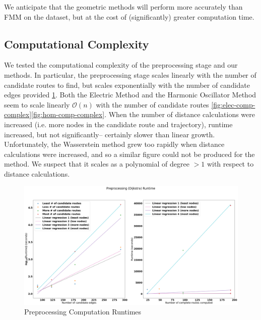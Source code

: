 \documentclass{article}
\numberwithin{equation}{section}
\theoremstyle{definition}
\begin{document}

We anticipate that the geometric methods will perform more accurately than FMM on the dataset, but at the cost of (significantly) greater computation time.

\subsection{Computational Complexity}

We tested the computational complexity of the preprocessing stage and our methods. In particular, the preprocessing stage scales linearly with the number of candidate routes to find, but scales exponentially with the number of candidate edges provided \ref{fig:pre-comp-complex}. Both the Electric Method and the Harmonic Oscillator Method seem to scale linearly $\mathcal{O}(n)$ with the number of candidate routes \ref{fig:elec-comp-complex}\ref{fig:hom-comp-complex}. When the number of distance calculations were increased (i.e. more nodes in the candidate route and trajectory), runtime increased, but not significantly-- certainly slower than linear growth. Unfortunately, the Wasserstein method grew too rapidly when distance calculations were increased, and so a similar figure could not be produced for the method. We suspect that it scales as a polynomial of degree $>1$ with respect to distance calculations.

\begin{figure}
    \centering
    \includegraphics[scale = 0.25]{Jupyter Notebook LaTeX/preprocessing.png}
    \caption{Preprocessing Computation Runtimes}
    \label{fig:pre-comp-complex}
\end{figure}
\end{document}
